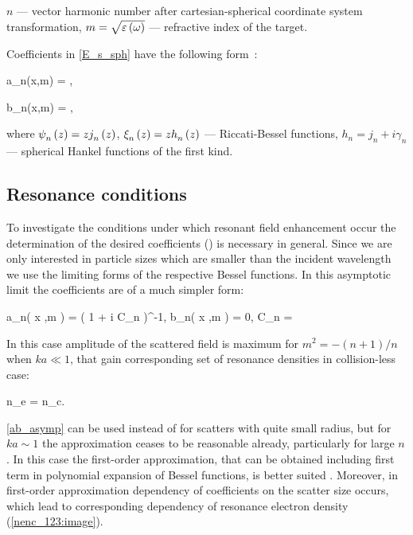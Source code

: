 \documentclass[conference]{IEEEtran}
\begin{document}
$n$ --- vector harmonic number after cartesian-spherical coordinate system transformation, $m = \sqrt{\varepsilon\left(\omega\right)}$ --- refractive index of the target.

Coefficients in \autoref{E_s_sph} have the following form~\cite{boren_huffman}:

    \eq
		a_n(x,\:m) = ,
		\label{an_bessel}
	\qe

    \eq
        b_n(x,\:m) = ,
        \label{bn_bessel}
    \qe
	\eqc %
    \cqe %

\noindent where ${\psi}_{n}^{} \left({z} \right) = z {j}_{n}^{} \left({z} \right)$, ${\xi}_{n}^{} \left({z} \right) = z {h}_{n}^{} \left({z} \right)$ --- Riccati-Bessel functions, $h_n = j_n + i \gamma_n$ --- spherical Hankel functions of the first kind.

\subsection{Resonance conditions}

To investigate the conditions under which resonant ﬁeld enhancement occur the determination of the desired coeﬃcients () is necessary in general. Since we are only interested in particle sizes which are smaller than the incident wavelength we use the limiting forms of the respective Bessel functions. In this asymptotic limit the coeﬃcients are of a much simpler form:

	\eq
		a_n\left( x ,\:m \right) = \left( 1 + i C_n   \right)^{-1},
	\label{ab_asymp}
	\qe
	\eqc
		b_n\left( x ,\:m \right) = 0,
	\cqe
	\eqc
		C_n = 
	\cqe
	\eqc
	\cqe

In this case amplitude of the scattered field is maximum for $m^2 = - (n+ 1) / n$ when $ka \ll 1$, that gain corresponding set of resonance densities in collision-less case:

	\eqc
		n_e = n_c.
	\cqe

\autoref{ab_asymp} can be used instead of  for scatters with quite small radius, but for $ka \sim 1$ the approximation ceases to be reasonable already, particularly for large $n$. In this case the first-order approximation, that can be obtained including first term in polynomial expansion of Bessel functions, is better suited \cite{abra_steg}. Moreover, in first-order approximation dependency of coefficients on the scatter size occurs, which lead to corresponding dependency of resonance electron density (\autoref{nenc_123:image}).
\end{document}
